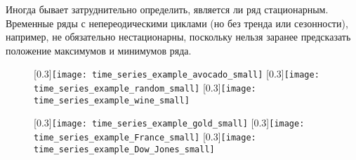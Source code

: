 Иногда бывает затруднительно определить, является ли ряд стационарным. Временные ряды с 
непереодическими циклами (но без тренда или сезонности), например, не обязательно нестационарны, поскольку 
нельзя заранее предсказать положение максимумов и минимумов ряда.

\begin{figure}[h!]
    \centering
    \subcaptionbox{\label{fig:time_series_example_avocado_small}}[0.3\textwidth]{\texttt{[image: time\_series\_example\_avocado\_small]}}
    \hfill
    \subcaptionbox{\label{fig:time_series_example_random_small}}[0.3\textwidth]{\texttt{[image: time\_series\_example\_random\_small]}}
    \hfill
    \subcaptionbox{\label{fig:time_series_example_wine_small}}[0.3\textwidth]{\texttt{[image: time\_series\_example\_wine\_small]}}
    
    \vspace{0.5cm}
    \subcaptionbox{\label{fig:time_series_example_gold_small}}[0.3\textwidth]{\texttt{[image: time\_series\_example\_gold\_small]}}
    \hfill
    \subcaptionbox{\label{fig:time_series_example_France_small}}[0.3\textwidth]{\texttt{[image: time\_series\_example\_France\_small]}}
    \hfill
    \subcaptionbox{\label{fig:time_series_example_Dow_Jones_small}}[0.3\textwidth]{\texttt{[image: time\_series\_example\_Dow\_Jones\_small]}}
    

\end{figure}
